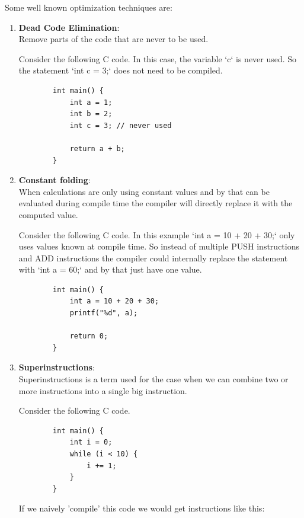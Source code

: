 \documentclass{article}
\begin{document}
Some well known optimization techniques are:
\begin{enumerate}
    \item \textbf{Dead Code Elimination}:\\
    \label{item:dead_code_elimination}
        Remove parts of the code that are never to be used.

        Consider the following C code. In this case, the variable `c` is never
        used. So the statement `int c = 3;` does not need to be compiled.
        \begin{verbatim}
        int main() {
            int a = 1;
            int b = 2;
            int c = 3; // never used

            return a + b;
        }
        \end{verbatim}
    \item \textbf{Constant folding}:\\
        When calculations are only using constant values and by that can be
        evaluated during compile time the compiler will directly replace it
        with the computed value.

        Consider the following C code. In this example `int a = 10 + 20 + 30;`
        only uses values known at compile time. So instead of multiple PUSH
        instructions and ADD instructions the compiler could internally replace
        the statement with `int a = 60;` and by that just have one value.

        \begin{verbatim}
        int main() {
            int a = 10 + 20 + 30;
            printf("%d", a);

            return 0;
        }
        \end{verbatim}
    \item \textbf{Superinstructions}:\\
        Superinstructions is a term used for the case when we can combine two or
        more instructions into a single big instruction.

        Consider the following C code.

        \begin{verbatim}
        int main() {
            int i = 0;
            while (i < 10) {
                i += 1;
            }
        }
        \end{verbatim}

        If we naively 'compile' this code we would get instructions like this:

        \begin{verbatim}


\end{verbatim}
\end{enumerate}
\end{document}
